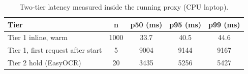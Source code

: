 \begin{table}[t]
\centering
\scriptsize
\caption{Two-tier latency measured inside the running proxy (CPU laptop).}
\label{tab:latency}
\begin{tabular}{lcccc}
\hline
Tier & n & p50 (ms) & p95 (ms) & p99 (ms) \\
\hline
Tier 1 inline, warm & 1000 & 33.7 & 40.5 & 44.6 \\
Tier 1, first request after start & 5 & 9004 & 9144 & 9167 \\
Tier 2 hold (EasyOCR) & 20 & 3435 & 5256 & 5427 \\
\hline
\end{tabular}
\end{table}
